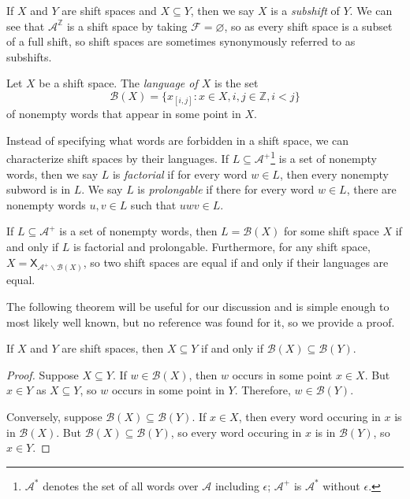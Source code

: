 \documentclass[hidelinks]{report}
\newcommand{\Ac}{\mathcal{A}}  %
\newcommand{\Bc}{\mathcal{B}}
\newcommand{\Fc}{\mathcal{F}}
\newcommand{\shift}[1]{\mathsf{X}_{#1}}
\newcommand{\term}[1]{\textit{#1}}
\theoremstyle{definition}
\begin{document}
If \(X\) and \(Y\) are shift spaces and \(X \subseteq Y\), then we say \(X\) is a \term{subshift} of \(Y\).
We can see that \(\Ac^\mathbb{Z}\) is a shift space by taking \(\Fc = \varnothing\), so as 
every shift space is a subset of a full shift, so shift spaces are sometimes synonymously referred to 
as subshifts.

\begin{definition}
    Let \(X\) be a shift space. The \term{language of \(X\)} is the set 
    \[\Bc(X) = \{ x_{[i,j]} : x \in X, i, j \in \mathbb{Z}, i < j\}\]
    of nonempty words that appear in some point in \(X\).
\end{definition}

Instead of specifying what words are forbidden in a shift space, we can characterize 
shift spaces by their languages. If \(L \subseteq \Ac^+\)\footnote{
    \(\Ac^*\) denotes the set of all words over \(\Ac\) including \(\epsilon\);
    \(\Ac^+\) is \(\Ac^*\) without \(\epsilon\).
} is a set of nonempty words, then 
we say \(L\) is \term{factorial} if for every word \(w \in L\), then every nonempty subword 
is in \(L\). We say \(L\) is \term{prolongable} if there for every word \(w \in L\), 
there are nonempty words \(u, v \in L\) such that \(uwv \in L\).

\begin{theorem}[name=\cite{lind1995introduction}]
    If \(L \subseteq \Ac^+\) is a set of nonempty words, then \(L = \Bc(X)\) for some 
    shift space \(X\) if and only if \(L\) is factorial and prolongable. 
    Furthermore, for any shift space, \(X = \shift{\Ac^+\backslash\Bc(X)}\), so 
    two shift spaces are equal if and only if their languages are equal.
\end{theorem}

The following theorem will be useful for our discussion and is simple enough to 
most likely well known, but no reference was found for it, so we provide a proof.

\begin{theorem}
    If \(X\) and \(Y\) are shift spaces, then \(X \subseteq Y\) if and only if \(\Bc(X) \subseteq \Bc(Y)\).
\end{theorem}

\begin{proof}
    Suppose \(X \subseteq Y\). If \(w \in \Bc(X)\), then \(w\) occurs in some point 
    \(x \in X\). But \(x \in Y\) as \(X \subseteq Y\), so \(w\) occurs in some point 
    in \(Y\). Therefore, \(w \in \Bc(Y)\).

    Conversely, suppose \(\Bc(X) \subseteq \Bc(Y)\). If \(x \in X\), then every 
    word occuring in \(x\) is in \(\Bc(X)\). But \(\Bc(X) \subseteq \Bc(Y)\), 
    so every word occuring in \(x\) is in \(\Bc(Y)\), so \(x \in Y\).
\end{proof}
\end{document}
